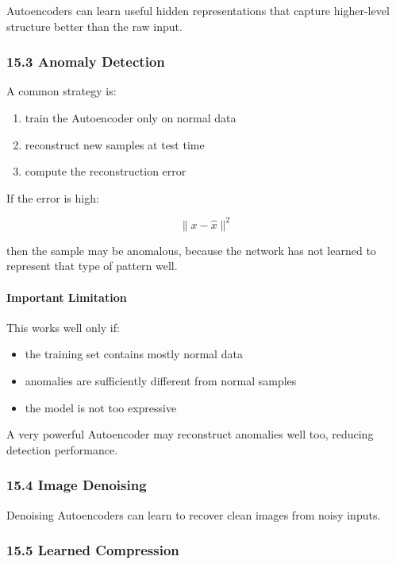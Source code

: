 \documentclass[
  italian,
  11pt,
]{article}
\begin{document}
Autoencoders can learn useful hidden representations that capture
higher-level structure better than the raw input.

\subsubsection{15.3 Anomaly Detection}\label{anomaly-detection}

A common strategy is:

\begin{enumerate}
\def\labelenumi{\arabic{enumi}.}
\item
  train the Autoencoder only on normal data
\item
  reconstruct new samples at test time
\item
  compute the reconstruction error
\end{enumerate}

If the error is high:

\[
\|x - \hat{x}\|^2
\]

then the sample may be anomalous, because the network has not learned to
represent that type of pattern well.

\paragraph{Important Limitation}\label{important-limitation}

This works well only if:

\begin{itemize}
\item
  the training set contains mostly normal data
\item
  anomalies are sufficiently different from normal samples
\item
  the model is not too expressive
\end{itemize}

A very powerful Autoencoder may reconstruct anomalies well too, reducing
detection performance.

\subsubsection{15.4 Image Denoising}\label{image-denoising}

Denoising Autoencoders can learn to recover clean images from noisy
inputs.

\subsubsection{15.5 Learned Compression}\label{learned-compression}
\end{document}
